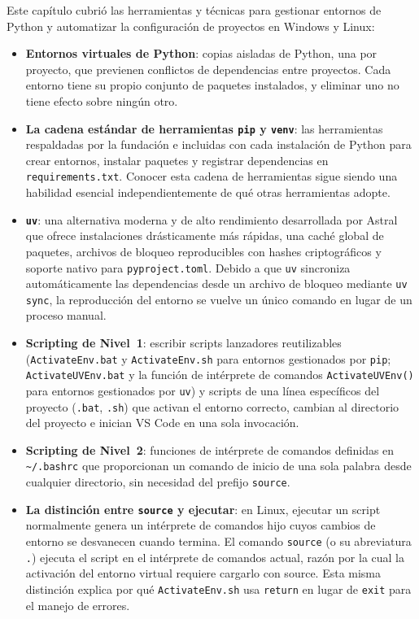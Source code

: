 Este capítulo cubrió las herramientas y técnicas para gestionar entornos de
Python y automatizar la configuración de proyectos en Windows y Linux:

\begin{itemize}
  \item \textbf{Entornos virtuales de Python}: copias aisladas de Python,
        una por proyecto, que previenen conflictos de dependencias entre
        proyectos. Cada entorno tiene su propio conjunto de paquetes
        instalados, y eliminar uno no tiene efecto sobre ningún otro.
  \item \textbf{La cadena estándar de herramientas \texttt{pip} y
        \texttt{venv}}: las herramientas respaldadas por la fundación e
        incluidas con cada instalación de Python para crear entornos,
        instalar paquetes y registrar dependencias en
        \texttt{requirements.txt}. Conocer esta cadena de herramientas
        sigue siendo una habilidad esencial independientemente de qué
        otras herramientas adopte.
  \item \textbf{\texttt{uv}}: una alternativa moderna y de alto rendimiento
        desarrollada por Astral que ofrece instalaciones drásticamente más
        rápidas, una caché global de paquetes, archivos de bloqueo
        reproducibles con hashes criptográficos y soporte nativo para
        \texttt{pyproject.toml}. Debido a que \texttt{uv} sincroniza
        automáticamente las dependencias desde un archivo de bloqueo
        mediante \texttt{uv sync}, la reproducción del entorno se vuelve
        un único comando en lugar de un proceso manual.
  \item \textbf{Scripting de Nivel~1}: escribir scripts lanzadores
        reutilizables (\texttt{ActivateEnv.bat} y \texttt{ActivateEnv.sh}
        para entornos gestionados por \texttt{pip};
        \texttt{ActivateUVEnv.bat} y la función de intérprete de comandos
        \texttt{ActivateUVEnv()} para entornos gestionados por
        \texttt{uv}) y scripts de una línea específicos del proyecto
        (\texttt{\ProjectName{}.bat}, \texttt{\ProjectName{}.sh}) que
        activan el entorno correcto, cambian al directorio del proyecto
        e inician VS Code en una sola invocación.
  \item \textbf{Scripting de Nivel~2}: funciones de intérprete de comandos
        definidas en \texttt{\textasciitilde/.bashrc} que proporcionan un
        comando de inicio de una sola palabra desde cualquier directorio,
        sin necesidad del prefijo \texttt{source}.
  \item \textbf{La distinción entre \texttt{source} y ejecutar}: en Linux,
        ejecutar un script normalmente genera un intérprete de comandos
        hijo cuyos cambios de entorno se desvanecen cuando termina. El
        comando \texttt{source} (o su abreviatura \texttt{.}) ejecuta el
        script en el intérprete de comandos actual, razón por la cual la
        activación del entorno virtual requiere cargarlo con source. Esta
        misma distinción explica por qué \texttt{ActivateEnv.sh} usa
        \texttt{return} en lugar de \texttt{exit} para el manejo de
        errores.
\end{itemize}

